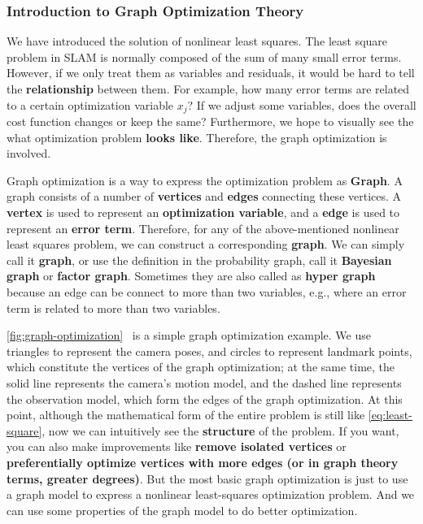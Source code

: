 \subsubsection{Introduction to Graph Optimization Theory}
We have introduced the solution of nonlinear least squares. The least square problem in SLAM is normally composed of the sum of many small error terms. However, if we only treat them as variables and residuals, it would be hard to tell the \textbf{relationship} between them. For example, how many error terms are related to a certain optimization variable $x_j$? If we adjust some variables, does the overall cost function changes or keep the same? Furthermore, we hope to visually see the what optimization problem \textbf{looks like}. Therefore, the graph optimization is involved.

Graph optimization is a way to express the optimization problem as \textbf{Graph}.  A graph consists of a number of \textbf{vertices} and \textbf{edges} connecting these vertices. A  \textbf{vertex} is used to represent an \textbf{optimization variable}, and a \textbf{edge} is used to represent an \textbf{error term}. Therefore, for any of the above-mentioned nonlinear least squares problem, we can construct a corresponding \textbf{graph}. We can simply call it \textbf{graph}, or use the definition in the probability graph, call it \textbf{Bayesian graph} or \textbf{factor graph}. Sometimes they are also called as \textbf{hyper graph} because an edge can be connect to more than two variables, e.g., where an error term is related to more than two variables. 

\autoref{fig:graph-optimization}~ is a simple graph optimization example. We use triangles to represent the camera poses, and circles to represent landmark points, which constitute the vertices of the graph optimization; at the same time, the solid line represents the camera's motion model, and the dashed line represents the observation model, which form the edges of the graph optimization. At this point, although the mathematical form of the entire problem is still like \eqref{eq:least-square}, now we can intuitively see the \textbf{structure} of the problem. If you want, you can also make improvements like \textbf{remove isolated vertices} or \textbf{preferentially optimize vertices with more edges (or in graph theory terms, greater degrees)}. But the most basic graph optimization is just to use a graph model to express a nonlinear least-squares optimization problem. And we can use some properties of the graph model to do better optimization.

